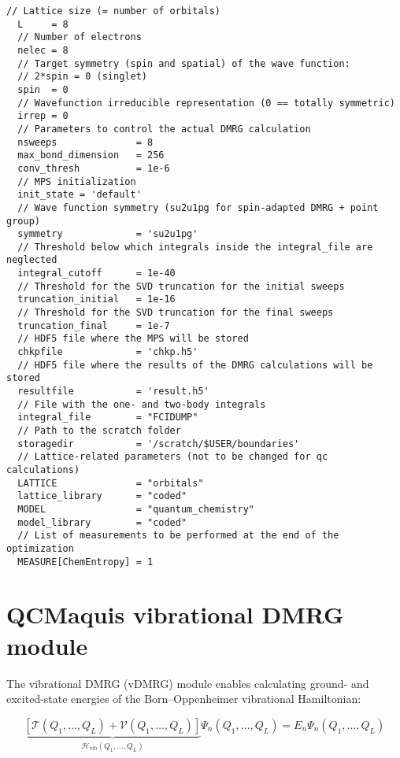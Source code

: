 \documentclass[bibliography=totoc,12pt,a4paper]{scrartcl}
\newcommand{\qcm}{\textsc{QCMaquis}}
\begin{document}
\begin{lstlisting}[language=qcmaquis,caption={Input example for a DMRG-CASCI(8,8) standalone \qcm{} calculation},label=lst:qcm]
  // Lattice size (= number of orbitals)
  L     = 8
  // Number of electrons
  nelec = 8
  // Target symmetry (spin and spatial) of the wave function:
  // 2*spin = 0 (singlet)
  spin  = 0
  // Wavefunction irreducible representation (0 == totally symmetric)
  irrep = 0
  // Parameters to control the actual DMRG calculation
  nsweeps              = 8
  max_bond_dimension   = 256
  conv_thresh          = 1e-6
  // MPS initialization
  init_state = 'default'
  // Wave function symmetry (su2u1pg for spin-adapted DMRG + point group)
  symmetry             = 'su2u1pg'
  // Threshold below which integrals inside the integral_file are neglected
  integral_cutoff      = 1e-40
  // Threshold for the SVD truncation for the initial sweeps
  truncation_initial   = 1e-16
  // Threshold for the SVD truncation for the final sweeps
  truncation_final     = 1e-7
  // HDF5 file where the MPS will be stored
  chkpfile             = 'chkp.h5'
  // HDF5 file where the results of the DMRG calculations will be stored
  resultfile           = 'result.h5'
  // File with the one- and two-body integrals
  integral_file        = "FCIDUMP"
  // Path to the scratch folder
  storagedir           = '/scratch/$USER/boundaries'
  // Lattice-related parameters (not to be changed for qc calculations)
  LATTICE              = "orbitals"
  lattice_library      = "coded"
  MODEL                = "quantum_chemistry"
  model_library        = "coded"
  // List of measurements to be performed at the end of the optimization
  MEASURE[ChemEntropy] = 1
\end{lstlisting}

\section{QCMaquis vibrational DMRG module}
\label{sec:vDMRG}

The vibrational DMRG (vDMRG) module enables calculating ground- and excited-state energies of the Born--Oppenheimer vibrational Hamiltonian:

\begin{equation}
  \underbrace{\left[ \mathcal{T}(Q_1, \ldots, Q_L) + \mathcal{V}(Q_1, \ldots, Q_L) \right]}_{\mathcal{H}_\text{vib}(Q_1, \ldots, Q_L)} \Psi_n(Q_1, \ldots, Q_L) = E_n \Psi_n(Q_1, \ldots, Q_L)
  \label{eq:VibHam}
\end{equation}
\end{document}
